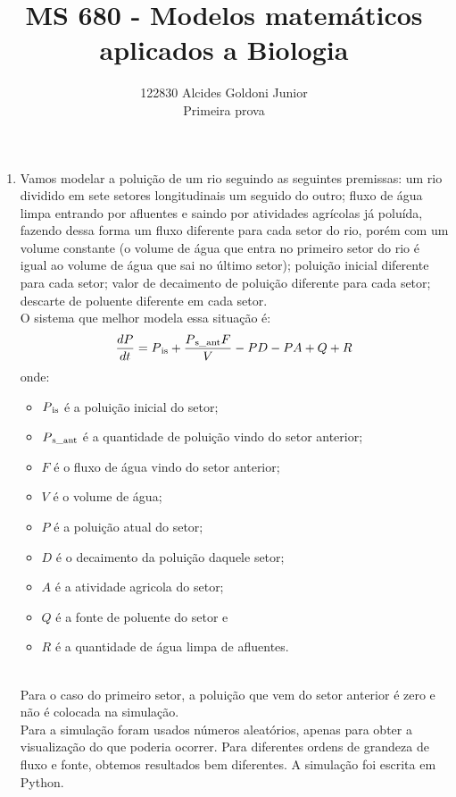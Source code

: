 \documentclass[a4paper]{article}
\title{MS 680 - Modelos matem\'{a}ticos aplicados a Biologia}
\author{122830 Alcides Goldoni Junior\\
  \Small Primeira prova \\
}%
\begin{document}
\maketitle
\begin{enumerate}
\item
Vamos modelar a polui\c{c}\~ao de um rio seguindo as seguintes premissas: um rio dividido em sete setores longitudinais um seguido do outro; fluxo de \'agua limpa entrando por afluentes e saindo por atividades agr\'icolas j\'a polu\'ida, fazendo dessa forma um fluxo diferente para cada setor do rio, por\'em com um volume constante (o volume de \'agua que entra no primeiro setor do rio \'e igual ao volume de \'agua que sai no \'ultimo setor); polui\c{c}\~ao inicial diferente para cada setor; valor de decaimento de polui\c{c}\~ao diferente para cada setor; descarte de poluente diferente em cada setor.
\\
O sistema que melhor modela essa situa\c{c}\~ao \'e:
\begin{equation}
\frac{dP}{dt} = P\textsubscript{is} + \frac{P\textsubscript{s\_ant}F }{V} - PD - PA + Q + R
\end{equation}
onde:
\begin{itemize}
\item$P\textsubscript{is}$ \'e a polui\c{c}\~ao inicial do setor;
\item$P\textsubscript{s\_ant}$ \'e a quantidade de polui\c{c}\~ao vindo do setor anterior;
\item$F$ \'e o fluxo de \'agua vindo do setor anterior;
\item$V$ \'e o volume de \'agua;
\item$P$ \'e a polui\c{c}\~ao atual do setor;
\item$D$ \'e o decaimento da polui\c{c}\~ao daquele setor;
\item$A$ \'e a atividade agricola do setor;
\item$Q$ \'e a fonte de poluente do setor e
\item$R$ \'e a quantidade de \'agua limpa de afluentes.
\end{itemize}
\\
Para o caso do primeiro setor, a polui\c{c}\~ao que vem do setor anterior \'e zero e n\~ao \'e colocada na simula\c{c}\~ao.
\\
Para a simula\c{c}\~ao foram usados n\'umeros aleat\'orios, apenas para obter a visualiza\c{c}\~ao do que poderia ocorrer. Para diferentes ordens de grandeza de fluxo e fonte, obtemos resultados bem diferentes. A simula\c{c}\~ao foi escrita em Python.

\end{enumerate}
\end{document}
